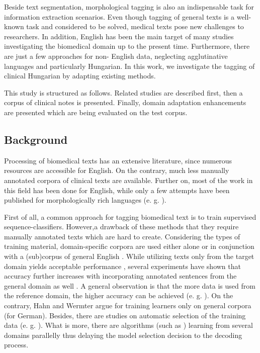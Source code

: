 Beside text segmentation, morphological tagging is also an indispensable task for information extraction scenarios. 
Even though tagging of general texts is a well-known task and considered to be solved, medical texts pose new challenges to researchers. 
In addition, English has been the main target of many studies investigating the biomedical domain up to the present time. 
Furthermore, there are just a few approaches for non- English data, neglecting agglutinative languages and particularly Hungarian.
In this work, we investigate the tagging of clinical Hungarian by adapting existing methods.%

This study is structured as follows. 
Related studies are described first, then a corpus of clinical notes is presented.
Finally, domain adaptation enhancements are presented which are being evaluated on the test corpus.

\subsection{Background}
\label{sec:biomed_tag}

Processing of biomedical texts has an extensive literature, since numerous resources are accessible for English. %
On the contrary, much less manually annotated corpora of clinical texts are available. 
Further on, most of the work in this field has been done for English, while only a few attempts have been published for morphologically rich languages (e. g. \cite{oleynik2009performance,rost2008lessons}).

First of all, a common approach for tagging biomedical text is to train supervised sequence-classifiers. 
However,a drawback of these methods that they require manually annotated texts which are hard to create.%
Considering the types of training material, domain-specific corpora are used either alone \cite{pakhomov2006developing,Savova2010,Smith2006} or in conjunction with a (sub)corpus of general English \cite{coden2005domain,ferraro2013improving,miller2007building}.%
While utilizing texts only from the target domain yields acceptable performance \cite{pakhomov2006developing,Savova2010,Smith2006}, 
several experiments have shown that accuracy further increases with incorporating annotated sentences from the general domain as well \cite{barrett2011token,coden2005domain}. 
A general observation is that the more data is used from the reference domain, the higher accuracy can be achieved (e. g. \cite{pestian2004development}). 
On the contrary, Hahn and Wermter argue for training learners only on general corpora \cite{hahn2004tagging} (for German). 
Besides, there are studies on automatic selection of the training data (e. g. \cite{liu2007heuristic}).%
What is more, there are algorithms (such as \cite{choi2012fast}) learning from several domains parallelly thus delaying the model selection decision to the decoding process. 

